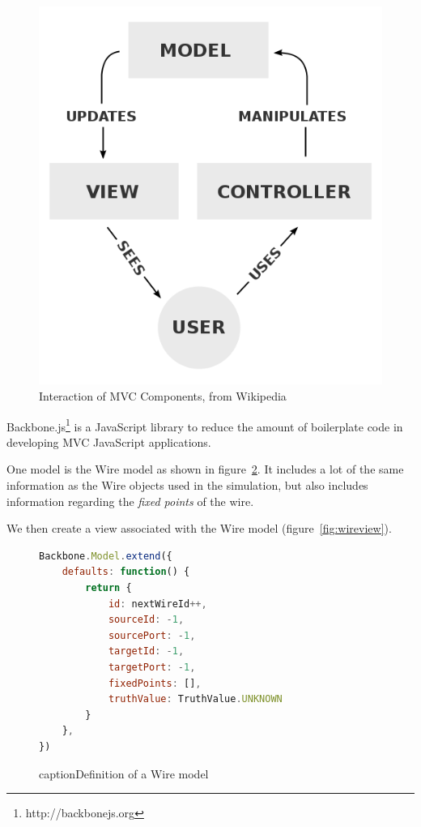 \begin{figure}
	\centering
	\includegraphics[width=\textwidth * 0.5]{mvc.png}
	\caption{Interaction of MVC Components, from Wikipedia}
	\label{fig:mvc}
\end{figure}

Backbone.js\footnote{http://backbonejs.org} is a JavaScript library to reduce the amount of boilerplate code in developing MVC JavaScript applications.

One model is the Wire model as shown in figure~\ref{fig:wiremodel}. It includes a lot of the same information as the Wire objects used in the simulation, but also includes information regarding the \textit{fixed points} of the wire.

We then create a view associated with the Wire model (figure~\ref{fig:wireview}). 

\begin{figure}
\begin{lstlisting}[language=JavaScript]
Backbone.Model.extend({
	defaults: function() {
    	return {
        	id: nextWireId++,
        	sourceId: -1,
        	sourcePort: -1,
       	 	targetId: -1,
        	targetPort: -1,
        	fixedPoints: [],
        	truthValue: TruthValue.UNKNOWN
    	}
	},
})
\end{lstlisting}
caption{Definition of a Wire model}
\label{fig:wiremodel}
\end{figure}

